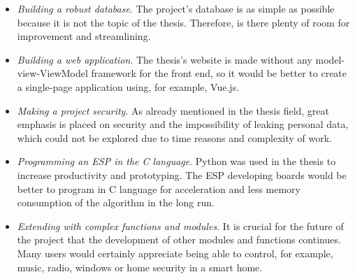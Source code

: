 \begin{itemize}
    \item \textit{Building a robust database}. The project's database is as simple as possible because it is not the topic of the thesis. Therefore, is there plenty of room for improvement and streamlining.
    \item \textit{Building a web application}. The thesis's website is made without any model-view-ViewModel framework for the front end, so it would be better to create a single-page application using, for example, Vue.js.
    \item \textit{Making a project security}. As already mentioned in the thesis field, great emphasis is placed on security and the impossibility of leaking personal data, which could not be explored due to time reasons and complexity of work.
    \item \textit{Programming an ESP in the C language}. Python was used in the thesis to increase productivity and prototyping. The ESP developing boards would be better to program in C language for acceleration and less memory consumption of the algorithm in the long run.
    \item \textit{Extending with complex functions and modules}. It is crucial for the future of the project that the development of other modules and functions continues. Many users would certainly appreciate being able to control, for example, music, radio, windows or home security in a smart home.
\end{itemize}
